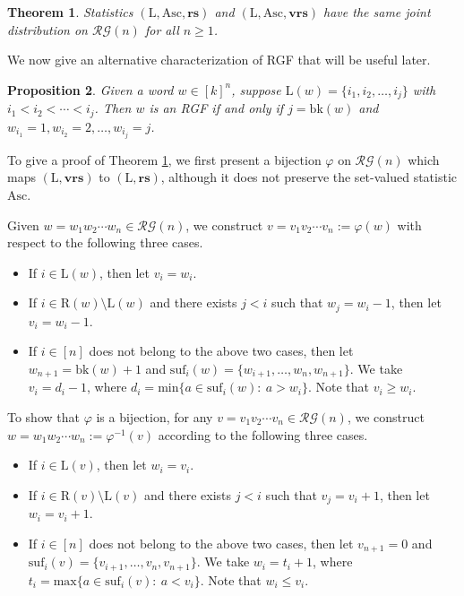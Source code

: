 \documentclass[12pt]{amsart}
\numberwithin{equation}{section}
\theoremstyle{plain}
\newtheorem{theorem}{Theorem}[section]
\newtheorem{proposition}[theorem]{Proposition}
\theoremstyle{definition}
\def\bk{\mathrm{bk}}
\def\Asc{\mathrm{Asc}}
\def\LL{\mathrm{L}}
\def\RR{\mathrm{R}}
\def\brs{\mathbf{rs}}
\def\bwrs{\mathbf{vrs}}
\def\suf{\mathrm{suf}}
\def\max{\mathrm{max}}
\def\min{\mathrm{min}}
\def\RG{\mathcal{RG}}
\begin{document}
\begin{theorem}\label{strong-main-bijection-r}
Statistics $(\LL, \Asc, \brs)$ and
$(\LL, \Asc, \bwrs)$ have the same joint distribution on $\RG(n)$ for all $n \geq  1$.
\end{theorem}

We now give an alternative characterization of RGF that will be useful later.

\begin{proposition}\label{char-RGF}
Given a word $w\in [k]^n$, suppose $\LL(w)=\{i_1,i_2,\ldots,i_j\}$ with $i_1<i_2<\cdots<i_j$. Then $w$ is an RGF if and only if $j=\bk(w)$ and $w_{i_1}=1,w_{i_2}=2,\ldots,w_{i_j}=j$.
\end{proposition}

To give a proof of Theorem \ref{strong-main-bijection-r}, we first present a bijection $\varphi$ on $\RG(n)$ which maps
$(\LL, \bwrs)$ to $(\LL, \brs)$, although it does not preserve the set-valued statistic $\Asc$.

Given $w=w_1 w_2 \cdots w_n \in \RG(n)$, we construct $v=v_1 v_2 \cdots v_n:=\varphi(w)$ with respect to the following three cases.

\begin{itemize}
  \item[I.] If $i \in \LL(w)$, then let $v_i = w_i$.
  \item[II.] If $i \in \RR(w) \setminus\LL(w)$ and there exists $j <i$ such that $w_j=w_i-1$, then let $v_i = w_i -1$.
 \item[III.] If $i \in [n]$ does not belong to the above two cases, then let  $w_{n+1}=\bk(w)+1$ and $\suf_i(w)=\{w_{i+1}, \ldots, w_n, w_{n+1}\}$. We take  $v_i=d_i -1$, where
        $d_i=\min\{a \in \suf_i (w):~ a > w_i\}$. Note that $v_i\ge w_i$.
\end{itemize}

To show that $\varphi$ is a bijection,
 for any $v=v_1v_2\cdots v_n \in \RG(n)$, we construct $w=w_1w_2\cdots w_n:=\varphi^{-1}(v)$ according to the following three cases.
\begin{itemize}
  \item[1.] If $i \in \LL(v)$, then let $w_i=v_i$.
  \item[2.] If $i \in \RR(v)\setminus\LL(v)$ and there exists $j <i $ such that $v_j=v_i+1$, then let $w_i=v_i +1$.
  \item[3.]  If $i \in [n]$ does not belong to the above two cases, then let $v_{n+1}=0$ and $\suf_i(v)=\{v_{i+1}, \ldots, v_n, v_{n+1}\}$. We take $w_i=t_i +1$, where
        $t_i=\max\{a \in \suf_i(v):~ a < v_i\}$. Note that $w_i\le v_i$.
\end{itemize}
\end{document}
